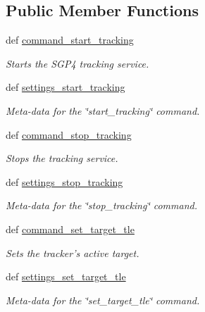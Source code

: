 \subsection*{Public Member Functions}
\begin{DoxyCompactItemize}
\item 
def \hyperlink{classhwm_1_1hardware_1_1devices_1_1drivers_1_1sgp4__tracker_1_1sgp4__tracker_1_1_s_g_p4_handler_addbc0a722b6e0c6779135c281cdeefdd}{command\-\_\-start\-\_\-tracking}
\begin{DoxyCompactList}\small\item\em Starts the S\-G\-P4 tracking service. \end{DoxyCompactList}\item 
def \hyperlink{classhwm_1_1hardware_1_1devices_1_1drivers_1_1sgp4__tracker_1_1sgp4__tracker_1_1_s_g_p4_handler_a085b1ebb8fb2d2f397d03087aee1778c}{settings\-\_\-start\-\_\-tracking}
\begin{DoxyCompactList}\small\item\em Meta-\/data for the \char`\"{}start\-\_\-tracking\char`\"{} command. \end{DoxyCompactList}\item 
def \hyperlink{classhwm_1_1hardware_1_1devices_1_1drivers_1_1sgp4__tracker_1_1sgp4__tracker_1_1_s_g_p4_handler_af0ceb95373f9e8994aa6424f0ac38e48}{command\-\_\-stop\-\_\-tracking}
\begin{DoxyCompactList}\small\item\em Stops the tracking service. \end{DoxyCompactList}\item 
def \hyperlink{classhwm_1_1hardware_1_1devices_1_1drivers_1_1sgp4__tracker_1_1sgp4__tracker_1_1_s_g_p4_handler_a59272c2bc477cc744a2221aa764f4f51}{settings\-\_\-stop\-\_\-tracking}
\begin{DoxyCompactList}\small\item\em Meta-\/data for the \char`\"{}stop\-\_\-tracking\char`\"{} command. \end{DoxyCompactList}\item 
def \hyperlink{classhwm_1_1hardware_1_1devices_1_1drivers_1_1sgp4__tracker_1_1sgp4__tracker_1_1_s_g_p4_handler_ac19d177cd8c9cdbe3d0b2e6c8b5f0d01}{command\-\_\-set\-\_\-target\-\_\-tle}
\begin{DoxyCompactList}\small\item\em Sets the tracker's active target. \end{DoxyCompactList}\item 
def \hyperlink{classhwm_1_1hardware_1_1devices_1_1drivers_1_1sgp4__tracker_1_1sgp4__tracker_1_1_s_g_p4_handler_a1366814d327e45f51666257a25c14cab}{settings\-\_\-set\-\_\-target\-\_\-tle}
\begin{DoxyCompactList}\small\item\em Meta-\/data for the \char`\"{}set\-\_\-target\-\_\-tle\char`\"{} command. \end{DoxyCompactList}\end{DoxyCompactItemize}


